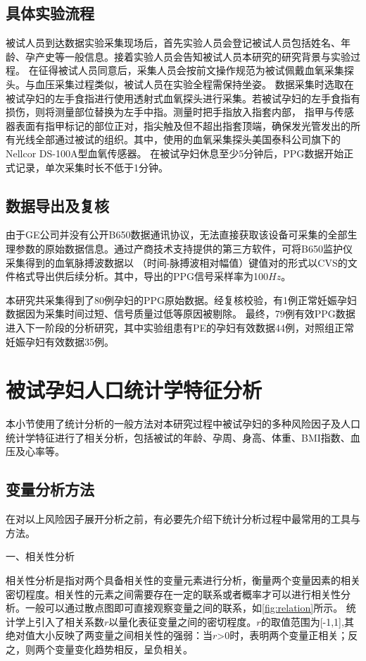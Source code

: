 \subsection{具体实验流程}
被试人员到达数据实验采集现场后，首先实验人员会登记被试人员包括姓名、年龄、孕产史等一般信息。接着实验人员会告知被试人员本研究的研究背景与实验过程。
在征得被试人员同意后，采集人员会按前文操作规范为被试佩戴血氧采集探头\cite{Chen2021}。与血压采集过程类似\cite{FIGO}，被试人员在实验全程需保持坐姿。
数据采集时选取在被试孕妇的左手食指进行使用透射式血氧探头进行采集。若被试孕妇的左手食指有损伤，则将测量部位替换为左手中指。测量时把手指放入指套内部，
指甲与传感器表面有指甲标记的部位正对，指尖触及但不超出指套顶端，确保发光管发出的所有光线全部通过被试的组织。其中，使用的血氧采集探头美国泰科公司旗下的Nellcor DS-100A型血氧传感器。 
在被试孕妇休息至少5分钟后，PPG数据开始正式记录，单次采集时长不低于1分钟。
\subsection{数据导出及复核}
由于GE公司并没有公开B650数据通讯协议，无法直接获取该设备可采集的全部生理参数的原始数据信息。通过产商技术支持提供的第三方软件，可将B650监护仪采集得到的血氧脉搏波数据以
（时间-脉搏波相对幅值）键值对的形式以CVS的文件格式导出供后续分析。其中，导出的PPG信号采样率为100$Hz$。

本研究共采集得到了80例孕妇的PPG原始数据。经复核校验，有1例正常妊娠孕妇数据因为采集时间过短、信号质量过低等原因被剔除。
最终，79例有效PPG数据进入下一阶段的分析研究，其中实验组患有PE的孕妇有效数据44例，对照组正常妊娠孕妇有效数据35例。
\section{被试孕妇人口统计学特征分析}
本小节使用了统计分析的一般方法对本研究过程中被试孕妇的多种风险因子及人口统计学特征进行了相关分析，包括被试的年龄、孕周、身高、体重、BMI指数、血压及心率等。
\subsection{变量分析方法}
在对以上风险因子展开分析之前，有必要先介绍下统计分析过程中最常用的工具与方法。

一、相关性分析

相关性分析是指对两个具备相关性的变量元素进行分析，衡量两个变量因素的相关密切程度\cite{Zhang2019}。相关性的元素之间需要存在一定的联系或者概率才可以进行相关性分析。一般可以通过散点图即可直接观察变量之间的联系，如\autoref{fig:relation}所示。
统计学上引入了相关系数$r$以量化表征变量之间的密切程度。$r$的取值范围为[-1,1],其绝对值大小反映了两变量之间相关性的强弱：当$r$>0时，表明两个变量正相关；反之，则两个变量变化趋势相反，呈负相关。

